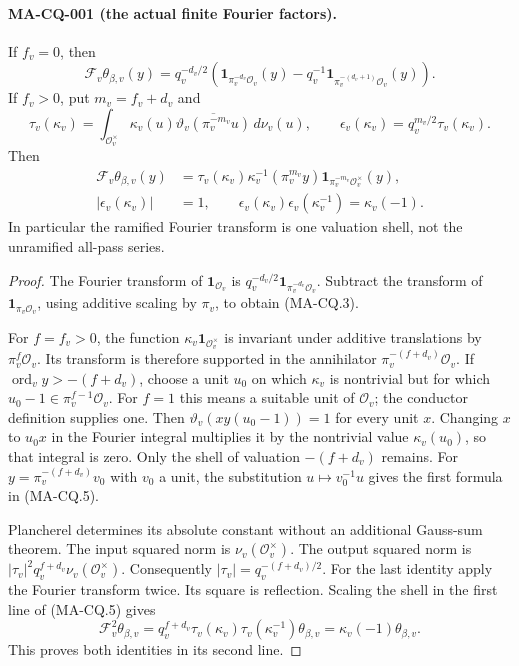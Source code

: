 \paragraph{MA-CQ-001 (the actual finite Fourier factors).}
If $f_v=0$, then
\[
 \mathcal F_v\theta_{\beta,v}(y)
   =q_v^{-d_v/2}
       \left(\mathbf1_{\pi_v^{-d_v}\mathcal O_v}(y)
         -q_v^{-1}
           \mathbf1_{\pi_v^{-(d_v+1)}\mathcal O_v}(y)\right).
\tag{MA-CQ.3}
\]
If $f_v>0$, put $m_v=f_v+d_v$ and
\[
 \tau_v(\kappa_v)
   =\int_{\mathcal O_v^\times}\kappa_v(u)
       \overline{\vartheta_v(\pi_v^{-m_v}u)}\,d\nu_v(u),
 \qquad
 \epsilon_v(\kappa_v)=q_v^{m_v/2}\tau_v(\kappa_v).
\tag{MA-CQ.4}
\]
Then
\[
\begin{aligned}
 \mathcal F_v\theta_{\beta,v}(y)
   &=\tau_v(\kappa_v)
        \kappa_v^{-1}(\pi_v^{m_v}y)
            \mathbf1_{\pi_v^{-m_v}\mathcal O_v^\times}(y),\\
 |\epsilon_v(\kappa_v)|&=1,\qquad
 \epsilon_v(\kappa_v)\epsilon_v(\kappa_v^{-1})
                                      =\kappa_v(-1).
\end{aligned}
\tag{MA-CQ.5}
\]
In particular the ramified Fourier transform is one
valuation shell, not the unramified all-pass series.

\begin{proof}
The Fourier transform of $\mathbf1_{\mathcal O_v}$ is
$q_v^{-d_v/2}\mathbf1_{\pi_v^{-d_v}\mathcal O_v}$.
Subtract the transform of $\mathbf1_{\pi_v\mathcal O_v}$,
using additive scaling by $\pi_v$, to obtain (MA-CQ.3).

For $f=f_v>0$, the function
$\kappa_v\mathbf1_{\mathcal O_v^\times}$ is invariant
under additive translations by $\pi_v^f\mathcal O_v$.
Its transform is therefore supported in the annihilator
$\pi_v^{-(f+d_v)}\mathcal O_v$.
If $\operatorname{ord}_v y>-(f+d_v)$, choose a unit
$u_0$ on which $\kappa_v$ is nontrivial but for which
$u_0-1\in\pi_v^{f-1}\mathcal O_v$.
For $f=1$ this means a suitable unit of $\mathcal O_v$;
the conductor definition supplies one.
Then $\vartheta_v(xy(u_0-1))=1$ for every unit $x$.
Changing $x$ to $u_0x$ in the Fourier integral
multiplies it by the nontrivial value $\kappa_v(u_0)$,
so that integral is zero.
Only the shell of valuation $-(f+d_v)$ remains.
For $y=\pi_v^{-(f+d_v)}v_0$ with $v_0$ a unit,
the substitution $u\mapsto v_0^{-1}u$ gives the
first formula in (MA-CQ.5).

Plancherel determines its absolute constant without
an additional Gauss-sum theorem.  The input squared
norm is $\nu_v(\mathcal O_v^\times)$.
The output squared norm is
$|\tau_v|^2q_v^{f+d_v}\nu_v(\mathcal O_v^\times)$.
Consequently $|\tau_v|=q_v^{-(f+d_v)/2}$.
For the last identity apply the Fourier transform twice.
Its square is reflection.  Scaling the shell in the
first line of (MA-CQ.5) gives
\[
 \mathcal F_v^2\theta_{\beta,v}
   =q_v^{f+d_v}
        \tau_v(\kappa_v)\tau_v(\kappa_v^{-1})
                            \theta_{\beta,v}
   =\kappa_v(-1)\theta_{\beta,v}.
\]
This proves both identities in its second line.
\end{proof}

